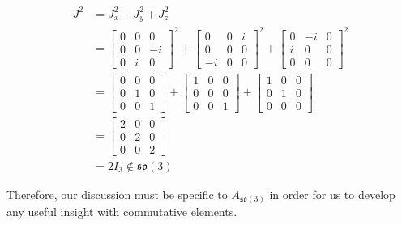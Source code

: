 \documentclass[10pt]{ucthesis}
\begin{document}
\begin{equation} 
	\begin{aligned}
		J^2  &= J_x^2 + J_y^2 + J_z^2 \\
					&= \begin{bmatrix}
								0& 0 & 0 \\
								0 & 0 & -i \\
								0 & i & 0
							\end{bmatrix}^2 +\begin{bmatrix}
													0 & 0 & i \\
													0 & 0 & 0 \\
													-i & 0 & 0
												\end{bmatrix}^2 + \begin{bmatrix}
																			0 & -i & 0\\
																			i & 0 & 0 \\
																			0 & 0 & 0
																		\end{bmatrix}^2 \\
					&= \begin{bmatrix}
								0& 0 & 0 \\
								0 & 1 & 0 \\
								0 & 0 & 1
							\end{bmatrix} +\begin{bmatrix}
													1 & 0 & 0 \\
													0 & 0 & 0 \\
													0 & 0 & 1
												\end{bmatrix} + \begin{bmatrix}
																			1 & 0 & 0\\
																			0 & 1 & 0 \\
																			0 & 0 & 0
																		\end{bmatrix} \\
					&= \begin{bmatrix}
								2& 0 & 0 \\
								0 & 2 & 0 \\
								0 & 0 & 2
							\end{bmatrix} \\
					&= 2I_3 \notin \mathfrak{so(3)}
	\end{aligned}
\end{equation} 

Therefore, our discussion must be specific to $A_\mathfrak{so(3)}$ in order for us to develop any useful insight with commutative elements.
\end{document}
